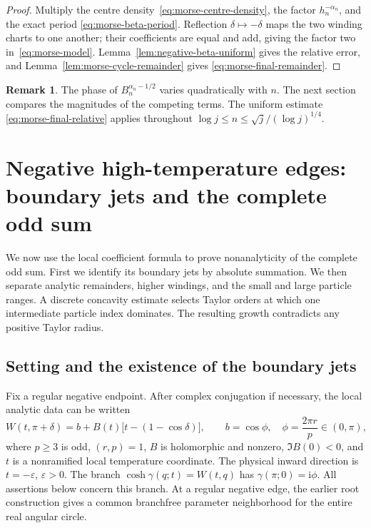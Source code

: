 \documentclass[11pt]{article}
\numberwithin{equation}{section}
\theoremstyle{definition}
\newtheorem{remark}[theorem]{Remark}
\newcommand{\ii}{\mathrm i}
\newcommand{\eps}{\varepsilon}
\begin{document}
\begin{proof}
Multiply the centre density~\eqref{eq:morse-centre-density}, the
factor $h_n^{-\alpha_n}$, and the exact period
\eqref{eq:morse-beta-period}.  Reflection $\delta\mapsto-\delta$
maps the two winding charts to one another; their coefficients are
equal and add, giving the factor two in~\eqref{eq:morse-model}.
Lemma~\ref{lem:negative-beta-uniform} gives the relative error, and
Lemma~\ref{lem:morse-cycle-remainder} gives
\eqref{eq:morse-final-remainder}.
\end{proof}

\begin{remark}
The phase of $B_n^{\alpha_n-1/2}$ varies quadratically with $n$.
The next section compares the magnitudes of the competing terms.
The uniform estimate \eqref{eq:morse-final-relative} applies
throughout $\log j\le n\le\sqrt j/(\log j)^{1/4}$.
\end{remark}



\section{Negative high-temperature edges: boundary jets and the complete odd sum}
\label{sec:jets}

We now use the local coefficient formula to prove nonanalyticity of the
complete odd sum. First we identify its boundary jets by absolute
summation. We then separate analytic remainders, higher windings, and
the small and large particle ranges. A discrete concavity estimate
selects Taylor orders at which one intermediate particle index dominates.
The resulting growth contradicts any positive Taylor radius.

\subsection{Setting and the existence of the boundary jets}

Fix a regular negative endpoint. After complex conjugation if necessary,
the local analytic data can be written
\begin{equation}\label{eq:jets_setting}
 W(t,\pi+\delta)=b+B(t)\bigl[t-(1-\cos\delta)\bigr],\qquad
 b=\cos\phi,\quad \phi=\frac{2\pi r}{p}\in(0,\pi),
\end{equation}
where $p\ge3$ is odd, $(r,p)=1$, $B$ is holomorphic and nonzero,
$\Im B(0)<0$, and $t$ is a nonramified local temperature coordinate.
The physical inward direction is $t=-\eps$, $\eps>0$. The branch
$\cosh\gamma(q;t)=W(t,q)$ has
$\gamma(\pi;0)=\ii\phi$. All assertions below concern this branch.
At a regular negative edge, the earlier root construction gives a common
branchfree parameter neighborhood for the entire real angular circle.
\end{document}
